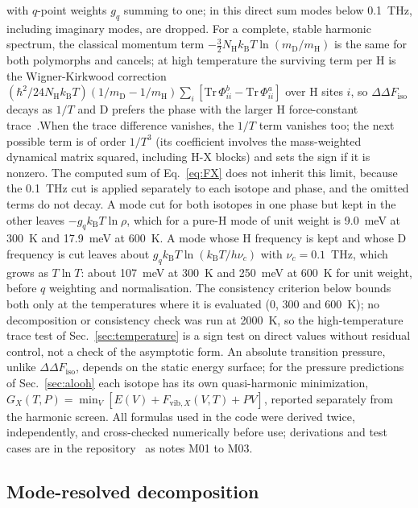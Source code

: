 \documentclass[aps,prmaterials,reprint,superscriptaddress,nofootinbib]{revtex4-2}
\newcommand{\ddF}{\Delta\Delta F_{\mathrm{iso}}}
\begin{document}
with $q$-point weights $g_q$ summing to one; in this direct sum modes below 0.1~THz, including imaginary modes, are dropped. For a complete, stable harmonic spectrum, the classical momentum term $-\tfrac{3}{2}N_{\mathrm{H}}k_{\mathrm{B}}T\ln(m_{\mathrm{D}}/m_{\mathrm{H}})$ is the same for both polymorphs and cancels; at high temperature the surviving term per H is the Wigner-Kirkwood correction $(\hbar^2/24N_{\mathrm{H}}k_{\mathrm{B}}T)(1/m_{\mathrm{D}} - 1/m_{\mathrm{H}})\sum_i[\mathrm{Tr}\,\Phi^b_{ii} - \mathrm{Tr}\,\Phi^a_{ii}]$ over H sites $i$, so $\ddF$ decays as $1/T$ and D prefers the phase with the larger H force-constant trace~\cite{Bigeleisen1947,Urey1947}.When the trace difference vanishes, the $1/T$ term vanishes too; the next possible term is of order $1/T^3$ (its coefficient involves the mass-weighted dynamical matrix squared, including H-X blocks) and sets the sign if it is nonzero. The computed sum of Eq.~\eqref{eq:FX} does not inherit this limit, because the 0.1~THz cut is applied separately to each isotope and phase, and the omitted terms do not decay. A mode cut for both isotopes in one phase but kept in the other leaves $-g_q k_{\mathrm{B}}T\ln\rho$, which for a pure-H mode of unit weight is 9.0~meV at 300~K and 17.9~meV at 600~K. A mode whose H frequency is kept and whose D frequency is cut leaves about $g_q k_{\mathrm{B}}T\ln(k_{\mathrm{B}}T/h\nu_c)$ with $\nu_c = 0.1$~THz, which grows as $T\ln T$: about 107~meV at 300~K and 250~meV at 600~K for unit weight, before $q$ weighting and normalisation. The consistency criterion below bounds both only at the temperatures where it is evaluated (0, 300 and 600~K); no decomposition or consistency check was run at 2000~K, so the high-temperature trace test of Sec.~\ref{sec:temperature} is a sign test on direct values without residual control, not a check of the asymptotic form. An absolute transition pressure, unlike $\ddF$, depends on the static energy surface; for the pressure predictions of Sec.~\ref{sec:alooh} each isotope has its own quasi-harmonic minimization, $G_X(T,P) = \min_V[E(V) + F_{\mathrm{vib},X}(V,T) + PV]$, reported separately from the harmonic screen. All formulas used in the code were derived twice, independently, and cross-checked numerically before use; derivations and test cases are in the repository~\cite{IsoShiftGitHub} as notes M01 to M03.

\subsection{Mode-resolved decomposition}
\end{document}
